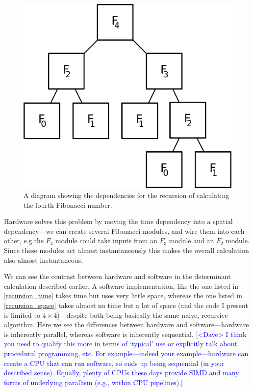\documentclass[12pt]{article}
\newcommand{\note}[2][red]{\textcolor{#1}{#2}}
\newcommand{\notedme}[1]{\note[blue]{[<Dave> #1]}}
\begin{document}
\begin{figure}[thp]
	\centering
	
	\includegraphics[width=\textwidth]{fib-block.pdf}
	
	\caption{A diagram showing the dependencies for the recursion of calculating the fourth Fibonacci number.}
	\label{fib_block}
\end{figure}

Hardware solves this problem by moving the time dependency into a spatial dependency---we can create several Fibonacci modules, and wire them into each other, e.g.\@ the $F_4$ module could take inputs from an $F_3$ module and an $F_2$ module. Since these modules act almost instantaneously this makes the overall calculation also almost instantaneous.

We can see the contrast between hardware and software in the determinant calculation described earlier. A software implementation, like the one listed in \ref{recursion_time} takes time but uses very little space, whereas the one listed in \ref{recursion_space} takes almost no time but a lot of space (and the code I present is limited to $4\times4$)---despite both being basically the same naive, recursive algorithm. Here we see the differences between hardware and software---hardware is inherently parallel, whereas software is inherently sequential.
\notedme{I think you need to qualify this more in terms of `typical' use or explicitly talk about procedural programming, etc. For example---indeed your example---hardware can create a CPU that can run software, so ends up being sequential (in your described sense). Equally, plenty of CPUs these days provide SIMD and many forms of underlying parallism (e.g., within CPU pipelines).}
\end{document}
